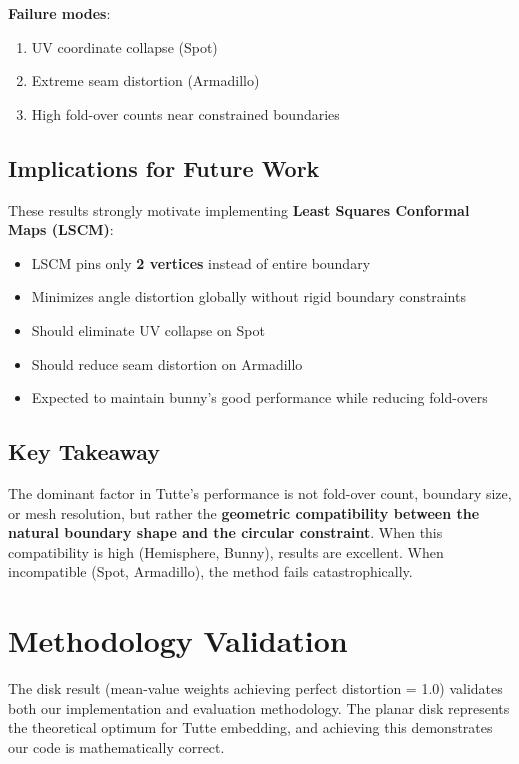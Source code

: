 \documentclass[11pt]{article}
\begin{document}
\textbf{Failure modes}:
\begin{enumerate}
    \item UV coordinate collapse (Spot)
    \item Extreme seam distortion (Armadillo)
    \item High fold-over counts near constrained boundaries
\end{enumerate}

\subsection{Implications for Future Work}

These results strongly motivate implementing \textbf{Least Squares Conformal Maps (LSCM)}:

\begin{itemize}
    \item LSCM pins only \textbf{2 vertices} instead of entire boundary
    \item Minimizes angle distortion globally without rigid boundary constraints
    \item Should eliminate UV collapse on Spot
    \item Should reduce seam distortion on Armadillo
    \item Expected to maintain bunny's good performance while reducing fold-overs
\end{itemize}

\subsection{Key Takeaway}

The dominant factor in Tutte's performance is not fold-over count, boundary size, or mesh resolution, but rather the \textbf{geometric compatibility between the natural boundary shape and the circular constraint}. When this compatibility is high (Hemisphere, Bunny), results are excellent. When incompatible (Spot, Armadillo), the method fails catastrophically.

\section{Methodology Validation}

The disk result (mean-value weights achieving perfect distortion = 1.0) validates both our implementation and evaluation methodology. The planar disk represents the theoretical optimum for Tutte embedding, and achieving this demonstrates our code is mathematically correct.
\end{document}
